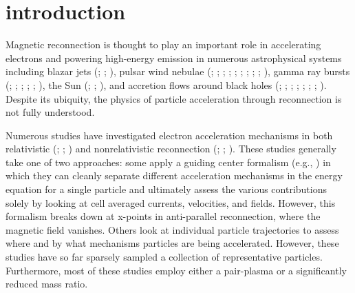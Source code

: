 \documentclass[iop,twocolappendix]{emulateapj}
\begin{document}
\maketitle

\section{introduction} \label{introduction}
Magnetic reconnection is thought to play an important role in accelerating electrons and powering high-energy emission in numerous astrophysical systems including blazar jets (\citealt{giannios2013}; \citealt{petropoulou2016}; \citealt{nalewajko2016}), pulsar wind nebulae (\citealt{coroniti1990}; \citealt{lyubarsky2001}; \citealt{zenitani2001}; \citealt{kirk2003}; \citealt{contopoulos2007}; \citealt{petri2008}; \citealt{sironi2011}; \citealt{cerutti2012, cerutti2014}; \citealt{cerutti2017}; \citealt{philippov2014}), gamma ray bursts (\citealt{thompson1994, thompson2006}; \citealt{usov1994}; \citealt{spruit2001}; \citealt{drenkhahn2002}; \citealt{lyutikov2003}; \citealt{giannios2008}), the Sun (\citealt{forbes1996}; \citealt{yokoyama2001}; \citealt{shibata2011}), and accretion flows around black holes (\citealt{galeev1979}; \citealt{dimatteo1998}; \citealt{uzdensky2008}; \citealt{li2015}; \citealt{ball2016, ball2017}; \citealt{li2017}; \citealt{dalpino2018}; \citealt{ramirez2018}).  Despite its ubiquity, the physics of particle acceleration through reconnection is not fully understood.  

Numerous studies have investigated electron acceleration mechanisms in both relativistic (\citealt{nalewajko2015}; \citealt{guo2015}; \citealt{werner2017}) and nonrelativistic reconnection (\citealt{dahlin2014}; \citealt{li_guo_2017}; \citealt{wangh2016}).  These studies generally take one of two approaches: some apply a guiding center formalism (e.g., \citealt{dahlin2014}) in which they can cleanly separate different acceleration mechanisms in the energy equation for a single particle and ultimately assess the various contributions solely by looking at cell averaged currents, velocities,  and fields. However, this formalism breaks down at x-points in anti-parallel reconnection, where the magnetic field vanishes.  Others look at individual particle trajectories to assess where and by what mechanisms particles are being accelerated.  However, these studies have so far sparsely sampled a collection of representative particles.  Furthermore, most of these studies employ either a pair-plasma or a significantly reduced mass ratio. 
\end{document}
